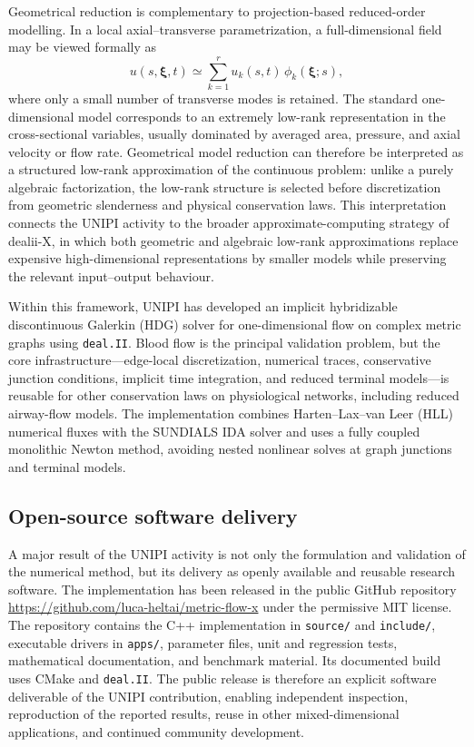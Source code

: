\documentclass[a4paper,12pt]{article}
\begin{document}
Geometrical reduction is complementary to projection-based reduced-order modelling. In a local axial--transverse parametrization, a full-dimensional field may be viewed formally as
\[
 u(s,\boldsymbol{\xi},t) \simeq \sum_{k=1}^{r} u_k(s,t)\,\phi_k(\boldsymbol{\xi};s),
\]
where only a small number of transverse modes is retained. The standard one-dimensional model corresponds to an extremely low-rank representation in the cross-sectional variables, usually dominated by averaged area, pressure, and axial velocity or flow rate. Geometrical model reduction can therefore be interpreted as a structured low-rank approximation of the continuous problem: unlike a purely algebraic factorization, the low-rank structure is selected before discretization from geometric slenderness and physical conservation laws. This interpretation connects the UNIPI activity to the broader approximate-computing strategy of dealii-X, in which both geometric and algebraic low-rank approximations replace expensive high-dimensional representations by smaller models while preserving the relevant input--output behaviour.

Within this framework, UNIPI has developed an implicit hybridizable discontinuous Galerkin (HDG) solver for one-dimensional flow on complex metric graphs using \texttt{deal.II}. Blood flow is the principal validation problem, but the core infrastructure---edge-local discretization, numerical traces, conservative junction conditions, implicit time integration, and reduced terminal models---is reusable for other conservation laws on physiological networks, including reduced airway-flow models. The implementation combines Harten--Lax--van Leer (HLL) numerical fluxes with the \textsc{SUNDIALS} IDA solver and uses a fully coupled monolithic Newton method, avoiding nested nonlinear solves at graph junctions and terminal models.

\subsection{Open-source software delivery}

A major result of the UNIPI activity is not only the formulation and validation of the numerical method, but its delivery as openly available and reusable research software. The implementation has been released in the public GitHub repository \url{https://github.com/luca-heltai/metric-flow-x} under the permissive MIT license. The repository contains the C++ implementation in \texttt{source/} and \texttt{include/}, executable drivers in \texttt{apps/}, parameter files, unit and regression tests, mathematical documentation, and benchmark material. Its documented build uses CMake and \texttt{deal.II}. The public release is therefore an explicit software deliverable of the UNIPI contribution, enabling independent inspection, reproduction of the reported results, reuse in other mixed-dimensional applications, and continued community development.
\end{document}
